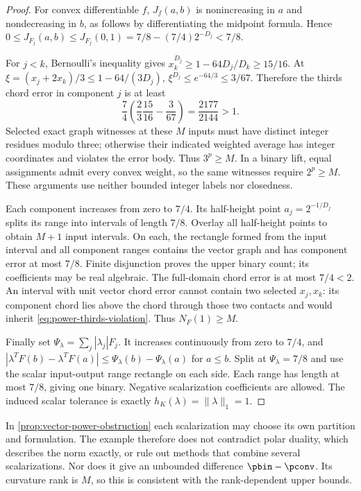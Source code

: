 \begin{proof}
For convex differentiable $f$, $J_f(a,b)$ is nonincreasing in $a$
and nondecreasing in $b$, as follows by differentiating the midpoint
formula. Hence $0\le J_{F_j}(a,b)\le J_{F_j}(0,1)
=7/8-(7/4)2^{-D_j}<7/8$.

For $j<k$, Bernoulli's inequality gives
$x_k^{D_j}\ge1-64D_j/D_k\ge15/16$. At
$\xi=(x_j+2x_k)/3\le1-64/(3D_j)$,
$\xi^{D_j}\le e^{-64/3}\le3/67$. Therefore the thirds chord error
in component $j$ is at least
\begin{equation}\label{eq:power-thirds-violation}
 \frac74\left(\frac23\frac{15}{16}-\frac3{67}\right)
 =\frac{2177}{2144}>1.
\end{equation}
Selected exact graph witnesses at these $M$ inputs must have distinct
integer residues modulo three; otherwise their indicated weighted
average has integer coordinates and violates the error body.
Thus $3^p\ge M$. In a binary lift, equal assignments admit every
convex weight, so the same witnesses require $2^p\ge M$.
These arguments use neither bounded integer labels nor closedness.

Each component increases from zero to $7/4$. Its half-height point
$a_j=2^{-1/D_j}$ splits its range into intervals of length $7/8$.
Overlay all half-height points to obtain $M+1$ input intervals.
On each, the rectangle formed from the input interval and all component
ranges contains the vector graph and has component error at most $7/8$.
Finite disjunction proves the upper binary count; its coefficients may
be real algebraic. The full-domain chord error is at most $7/4<2$.
An interval with unit vector chord error cannot contain two selected
$x_j,x_k$: its component chord lies above the chord through those two
contacts and would inherit \eqref{eq:power-thirds-violation}.
Thus $N_F(1)\ge M$.

Finally set $\Psi_\lambda=\sum_j|\lambda_j|F_j$. It increases
continuously from zero to $7/4$, and
$|\lambda^TF(b)-\lambda^TF(a)|\le\Psi_\lambda(b)-\Psi_\lambda(a)$
for $a\le b$. Split at $\Psi_\lambda=7/8$ and use the scalar
input-output range rectangle on each side. Each range has length at
most $7/8$, giving one binary. Negative scalarization coefficients
are allowed. The induced scalar tolerance is exactly
$h_K(\lambda)=\|\lambda\|_1=1$.
\end{proof}

In \cref{prop:vector-power-obstruction} each scalarization may choose
its own partition and formulation. The example therefore does not
contradict polar duality, which describes the norm exactly, or rule out
methods that combine several scalarizations. Nor does it give an
unbounded difference $\pbin-\pconv$. Its curvature rank is $M$,
so this is consistent with the rank-dependent upper bounds.


